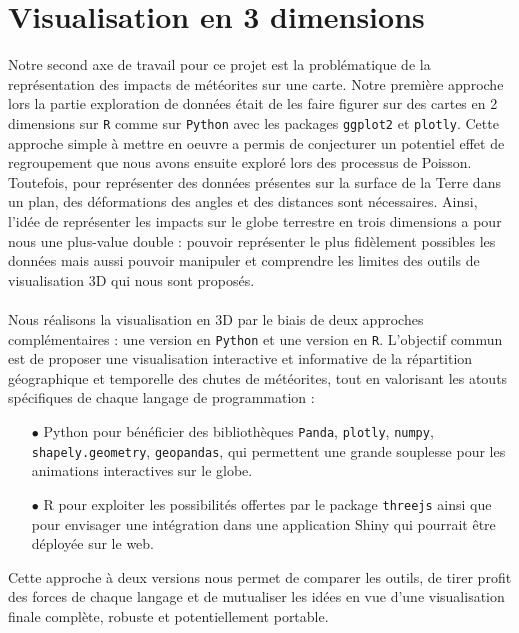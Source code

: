 \documentclass[12pt]{article}
\begin{document}
\section{Visualisation en 3 dimensions}
Notre second axe de travail pour ce projet est la problématique de la représentation des impacts de météorites sur une carte. Notre première approche lors la partie exploration de données était de les faire figurer sur des cartes en 2 dimensions sur \texttt{R} comme sur \texttt{Python} avec les packages \texttt{ggplot2} et \texttt{plotly}. Cette approche simple à mettre en oeuvre a permis de conjecturer un potentiel effet de regroupement que nous avons ensuite exploré lors des processus de Poisson. Toutefois, pour représenter des données présentes sur la surface de la Terre dans un plan, des déformations des angles et des distances sont nécessaires. Ainsi, l'idée de représenter les impacts sur le globe terrestre en trois dimensions a pour nous une plus-value double : pouvoir représenter le plus fidèlement possibles les données mais aussi pouvoir manipuler et comprendre les limites des outils de visualisation 3D qui nous sont proposés.\\
\\
Nous réalisons la visualisation en 3D par le biais de deux approches complémentaires : une version en \texttt{Python} et une version en \texttt{R}. L’objectif commun est de proposer une visualisation interactive et informative de la répartition géographique et temporelle des chutes de météorites, tout  en valorisant les atouts spécifiques de chaque langage de programmation :\\
\begin{itemize}
    \item[$\bullet$] Python pour bénéficier des bibliothèques \texttt{Panda}, \texttt{plotly}, \texttt{numpy}, \texttt{shapely.geometry}, \texttt{geopandas},  qui permettent une grande souplesse pour les animations interactives sur le globe.
    \item[$\bullet$] R pour exploiter les possibilités offertes par le package \texttt{threejs} ainsi que pour envisager une intégration dans une application Shiny qui pourrait être déployée sur le web.\\
\end{itemize}
Cette approche à deux versions nous permet de comparer les outils, de tirer profit des forces de chaque langage et de mutualiser les idées en vue d’une visualisation finale complète, robuste et potentiellement portable.
\end{document}
